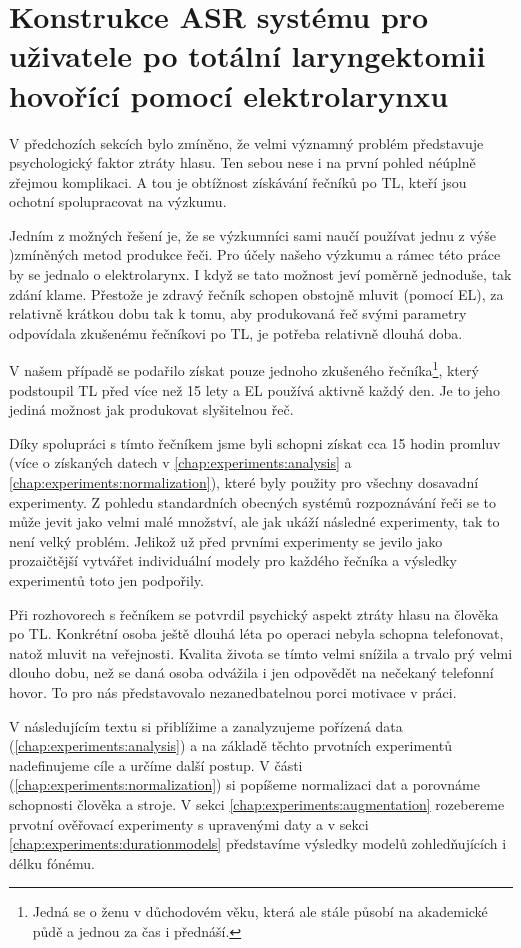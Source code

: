 \chapter{Konstrukce ASR systému pro uživatele po totální laryngektomii hovořící pomocí elektrolarynxu}
\label{chap:construction}

V předchozích sekcích bylo zmíněno, že velmi významný problém představuje psychologický faktor ztráty hlasu. Ten sebou nese i na první pohled néúplně zřejmou komplikaci. A tou je obtížnost získávání řečníků po TL, kteří jsou ochotní spolupracovat na výzkumu.

Jedním z možných řešení je, že se výzkumníci sami naučí používat jednu z výše  )zmíněných metod produkce řeči. Pro účely našeho výzkumu a rámec této práce by se jednalo o elektrolarynx. I když se tato možnost jeví poměrně jednoduše, tak zdání klame. Přestože je zdravý řečník schopen obstojně mluvit (pomocí EL), za relativně krátkou dobu tak k tomu, aby produkovaná řeč svými parametry odpovídala zkušenému řečníkovi po TL, je potřeba relativně dlouhá doba.

V našem případě se podařilo získat pouze jednoho zkušeného řečníka\footnote{Jedná se o ženu v důchodovém věku, která ale stále působí na akademické půdě a jednou za čas i přednáší.}, který podstoupil TL před více než 15 lety a EL používá aktivně každý den. Je to jeho jediná možnost jak produkovat slyšitelnou řeč.

Díky spolupráci s tímto řečníkem jsme byli schopni získat cca 15 hodin promluv (více o získaných datech v \ref{chap:experiments:analysis} a \ref{chap:experiments:normalization}), které byly použity pro všechny dosavadní experimenty. Z pohledu standardních obecných systémů rozpoznávání řeči se to může jevit jako velmi malé množství, ale jak ukáží následné experimenty, tak to není velký problém. Jelikož už před prvními experimenty se jevilo jako prozaičtější vytvářet individuální modely pro každého řečníka a výsledky experimentů toto jen podpořily.

Při rozhovorech s řečníkem se potvrdil psychický aspekt ztráty hlasu na člověka po TL. Konkrétní osoba ještě dlouhá léta po operaci nebyla schopna telefonovat, natož mluvit na veřejnosti. Kvalita života se tímto velmi snížila a trvalo prý velmi dlouho dobu, než se daná osoba odvážila i jen odpovědět na nečekaný telefonní hovor. To pro nás představovalo nezanedbatelnou porci motivace v práci.

V následujícím textu si přiblížime a zanalyzujeme pořízená data (\ref{chap:experiments:analysis}) a na základě těchto prvotních experimentů nadefinujeme cíle a určíme další postup. V části (\ref{chap:experiments:normalization}) si popíšeme normalizaci dat a porovnáme schopnosti člověka a stroje. V sekci \ref{chap:experiments:augmentation} rozebereme prvotní ověřovací experimenty s upravenými daty a v sekci \ref{chap:experiments:durationmodels} představíme výsledky modelů zohledňujících i délku fónému.

